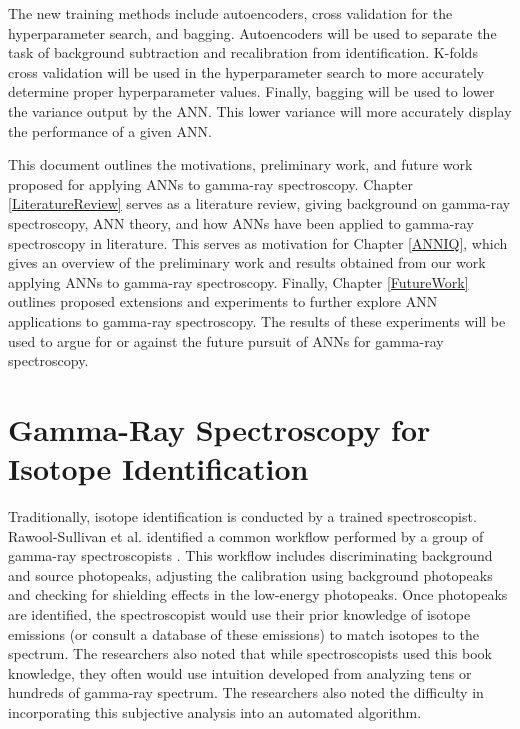 \documentclass[tocnosub,noragright,centerchapter,12pt,fullpage]{uiucecethesis09}
\begin{document}
The new training methods include autoencoders, cross validation for the hyperparameter search, and bagging. Autoencoders will be used to separate the task of background subtraction and recalibration from identification. K-folds cross validation will be used in the hyperparameter search to more accurately determine proper hyperparameter values. Finally, bagging will be used to lower the variance output by the ANN. This lower variance will more accurately display the performance of a given ANN. 


This document outlines the motivations, preliminary work, and future work proposed for applying ANNs to gamma-ray spectroscopy. Chapter \ref{LiteratureReview} serves as a literature review, giving background on gamma-ray spectroscopy, ANN theory, and how ANNs have been applied to gamma-ray spectroscopy in literature. This serves as motivation for Chapter \ref{ANNIQ}, which gives an overview of the preliminary work and results obtained from our work applying ANNs to gamma-ray spectroscopy. Finally, Chapter \ref{FutureWork} outlines proposed extensions and experiments to further explore ANN applications to gamma-ray spectroscopy. The results of these experiments will be used to argue for or against the future pursuit of ANNs for gamma-ray spectroscopy. 





\section{Gamma-Ray Spectroscopy for Isotope Identification}

Traditionally, isotope identification is conducted by a trained spectroscopist. Rawool-Sullivan et al. identified a common workflow performed by a group of gamma-ray spectroscopists \cite{Sullivan2010}. This workflow includes discriminating background and source photopeaks, adjusting the calibration using background photopeaks and checking for shielding effects in the low-energy photopeaks. Once photopeaks are identified, the spectroscopist would use their prior knowledge of isotope emissions (or consult a database of these emissions) to match isotopes to the spectrum. The researchers also noted that while  spectroscopists used this book knowledge, they often would use intuition developed from analyzing tens or hundreds of gamma-ray spectrum. The researchers also noted the difficulty in incorporating this subjective analysis into an automated algorithm.
\end{document}
